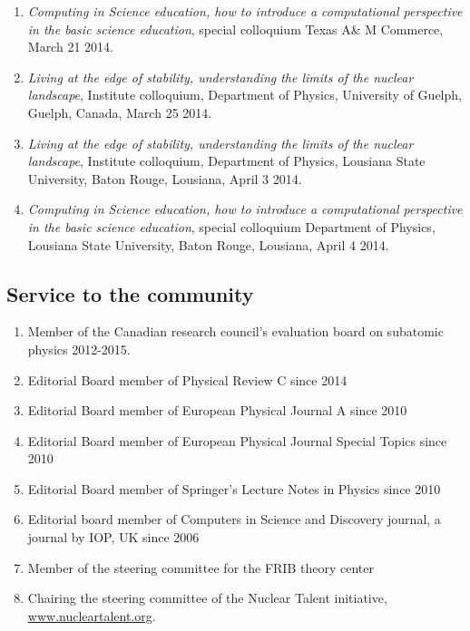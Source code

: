 \documentclass[prc,amsart,english,twocolumn,superscriptaddress,showpacs,floatfix]{revtex4}
\begin{document}
\begin{enumerate}
\item
{\em Computing in Science education, how to introduce a computational perspective in the basic science education}, special colloquium Texas A\& M Commerce, March 21 2014.

\item
{\em Living at the edge of stability, understanding the limits of the nuclear landscape}, Institute colloquium, Department of Physics, University of Guelph, Guelph, Canada, March 25 2014.

\item
{\em Living at the edge of stability, understanding the limits of the nuclear landscape}, Institute colloquium, Department of Physics, Lousiana State University, Baton Rouge, Lousiana, April 3 2014.

\item
{\em Computing in Science education, how to introduce a computational perspective in the basic science education}, special colloquium Department of Physics, Lousiana State University, Baton Rouge, Lousiana, April 4 2014.
 


\end{enumerate}


 \subsection*{Service to the community}

\begin{enumerate}
\item Member of the Canadian research council's evaluation board on subatomic physics 2012-2015.
\item Editorial Board member of Physical Review C since 2014
\item Editorial Board member of European Physical Journal A since 2010
\item Editorial Board member of European Physical Journal Special Topics since 2010
\item Editorial Board member of Springer's Lecture Notes in Physics since 2010
\item Editorial board member of Computers in Science and Discovery journal, a journal by IOP, UK since 2006
\item Member of the steering committee for the FRIB theory center
\item Chairing the steering committee of the Nuclear Talent initiative, \url{www.nucleartalent.org}.  
\end{enumerate}
\end{document}
